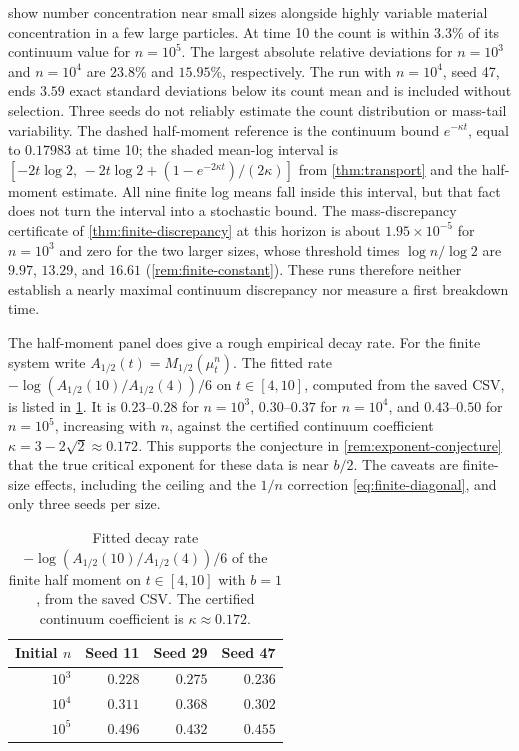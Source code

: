  show number concentration
near small sizes alongside highly variable material concentration in a few
large particles. At time 10 the count is within $3.3\%$ of its continuum
value for $n=10^5$. The largest absolute relative deviations for $n=10^3$
and $n=10^4$ are $23.8\%$ and $15.95\%$, respectively. The run with
$n=10^4$, seed 47, ends $3.59$ exact standard deviations
below its count mean and is included without selection. Three seeds do not
reliably estimate the count distribution or mass-tail variability. The
dashed half-moment reference is the continuum bound $e^{-\kappa t}$, equal
to $0.17983$ at time 10; the shaded mean-log interval is
$[-2t\log2,\,-2t\log2+(1-e^{-2\kappa t})/(2\kappa)]$ from
\cref{thm:transport} and the half-moment estimate. All nine finite log means
fall inside this interval, but that fact does not turn the interval into a
stochastic bound. The mass-discrepancy certificate of
\cref{thm:finite-discrepancy} at this horizon is about $1.95\times10^{-5}$
for $n=10^3$ and zero for the two larger sizes, whose threshold times
$\log n/\log2$ are $9.97$, $13.29$, and $16.61$ (\cref{rem:finite-constant}).
These runs therefore neither establish a nearly maximal continuum
discrepancy nor measure a first breakdown time.

The half-moment panel does give a rough empirical decay rate. For the
finite system write $A_{1/2}(t)=M_{1/2}(\mu_t^n)$. The fitted rate
$-\log(A_{1/2}(10)/A_{1/2}(4))/6$ on $t\in[4,10]$, computed from the saved
CSV, is listed in \cref{tab:finite-decay}. It is $0.23$--$0.28$ for
$n=10^3$, $0.30$--$0.37$ for $n=10^4$, and $0.43$--$0.50$ for $n=10^5$,
increasing with $n$, against the certified continuum coefficient
$\kappa=3-2\sqrt2\approx0.172$. This supports the conjecture in
\cref{rem:exponent-conjecture} that the true critical exponent for these
data is near $b/2$. The caveats are finite-size effects, including the
ceiling and the $1/n$ correction \eqref{eq:finite-diagonal}, and only three
seeds per size.

\begin{table}[tbp]
 \centering\small
 \begin{tabular}{@{}rrrr@{}}
 \toprule
 Initial $n$ & Seed 11 & Seed 29 & Seed 47\\
 \midrule
 $10^3$ & $0.228$ & $0.275$ & $0.236$\\
 $10^4$ & $0.311$ & $0.368$ & $0.302$\\
 $10^5$ & $0.496$ & $0.432$ & $0.455$\\
 \bottomrule
 \end{tabular}
 \caption{Fitted decay rate $-\log(A_{1/2}(10)/A_{1/2}(4))/6$ of the finite
 half moment on $t\in[4,10]$ with $b=1$, from the saved CSV. The certified
 continuum coefficient is $\kappa\approx0.172$.}
 \label{tab:finite-decay}
\end{table}

